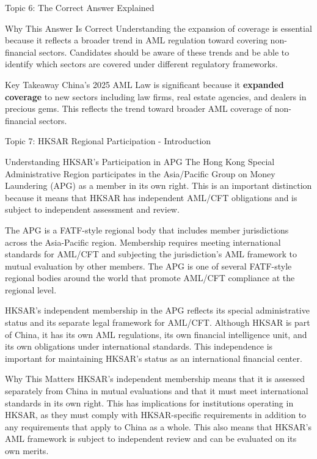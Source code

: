 \documentclass[8pt]{beamer}  %
\begin{document}
\begin{frame}{Topic 6: The Correct Answer Explained}
\begin{block}{\large Why This Answer Is Correct}
			Understanding the expansion of coverage is essential because it reflects a broader trend in AML regulation toward covering non-financial sectors. Candidates should be aware of these trends and be able to identify which sectors are covered under different regulatory frameworks.
		\end{block}
		
		\begin{alertblock}{Key Takeaway}
			China's 2025 AML Law is significant because it \textbf{expanded coverage} to new sectors including law firms, real estate agencies, and dealers in precious gems. This reflects the trend toward broader AML coverage of non-financial sectors.
		\end{alertblock}
	\end{frame}
	
	\begin{frame}{Topic 7: HKSAR Regional Participation - Introduction}
		\begin{block}{\large Understanding HKSAR's Participation in APG}
			The Hong Kong Special Administrative Region participates in the Asia/Pacific Group on Money Laundering (APG) as a member in its own right. This is an important distinction because it means that HKSAR has independent AML/CFT obligations and is subject to independent assessment and review.
			
			The APG is a FATF-style regional body that includes member jurisdictions across the Asia-Pacific region. Membership requires meeting international standards for AML/CFT and subjecting the jurisdiction's AML framework to mutual evaluation by other members. The APG is one of several FATF-style regional bodies around the world that promote AML/CFT compliance at the regional level.
			
			HKSAR's independent membership in the APG reflects its special administrative status and its separate legal framework for AML/CFT. Although HKSAR is part of China, it has its own AML regulations, its own financial intelligence unit, and its own obligations under international standards. This independence is important for maintaining HKSAR's status as an international financial center.
		\end{block}
		
		\vspace{0.2cm}
		\begin{block}{\large Why This Matters}
			HKSAR's independent membership means that it is assessed separately from China in mutual evaluations and that it must meet international standards in its own right. This has implications for institutions operating in HKSAR, as they must comply with HKSAR-specific requirements in addition to any requirements that apply to China as a whole. This also means that HKSAR's AML framework is subject to independent review and can be evaluated on its own merits.
		\end{block}
	\end{frame}
	
\end{document}
